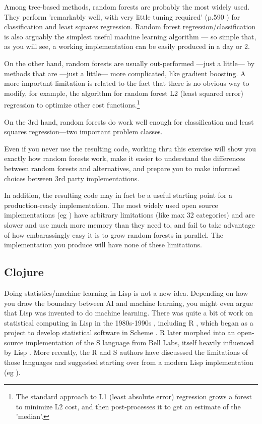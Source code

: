 \documentclass[10pt,openany]{article}
\numberwithin{definition}{section}
\numberwithin{example}{section}
\numberwithin{equation}{section}
\numberwithin{figure}{section}
\begin{document}
Among tree-based methods, random forests are probably the most widely
used. They perform 'remarkably well, with very little tuning required'
(p.590 \cite{hastie-tibshirani-friedman-2009}) for
classification and least squares regression. Random forest regression/classification
is also arguably the simplest useful machine learning algorithm ---
so simple that, as you will see, a working implementation can be easily
produced in a day or 2.

On the other hand, random forests are usually out-performed ---just
a little--- by methods that are ---just a little--- more complicated,
like gradient boosting. A more important limitation is related to
the fact that there is no obvious way to modify, for example, the
algorithm for random forest L2 (least squared error) regression to
optimize other cost functions.\footnote{The standard approach to L1 
(least absolute error) regression grows a forest to minimize L2 cost, 
and then post-processes it to get an estimate of the 
'median'.\cite{Meinshausen-QRF-2006}}

On the 3rd hand, random forests do work well enough for classification
and least squares regression---two important problem classes. 

Even if you never use the resulting code, working thru this exercise
will show you exactly how random forests work, make it easier to understand
the differences between random forests and alternatives, and prepare
you to make informed choices between 3rd party implementations.

In addition, the resulting code may in fact be a useful starting point
for a production-ready implementation. The most widely used open source
implementations (eg \cite{r-randomForest}) have arbitrary limitations
(like max 32 categories) and are slower and use much more memory than
they need to, and fail to take advantage of how embarassingly easy
it is to grow random forests in parallel. The implementation you produce
will have none of these limitations.


\subsection{Clojure}

Doing statistics/machine learning in Lisp is not a new idea. Depending
on how you draw the boundary between AI and machine learning, you
might even argue that Lisp was invented to do machine learning. There
was quite a bit of work on statistical computing in Lisp in the 1980s-1990s
\cite{donoho1983,mcdonald-pedersen-1988,oldford-peters-dinde-1988,Tierney-1990,Tierney-2005},
including R \cite{r-project}, which began as a project to develop
statistical software in Scheme \cite{ihaka-2010}. R later morphed
into an open-source implementation of the S language from Bell Labs,
itself heavily influenced by Lisp 
\cite{R:Becker+Chambers+Wilks:1988,R:Chambers+Hastie:1992,R:Chambers:1998}.
More recently, the R and S authors have discusssed the limitations
of those languages and suggested starting over from a modern Lisp
implementation (eg \cite{ihaka-lang-2008,Tierney-2005}).
\end{document}
